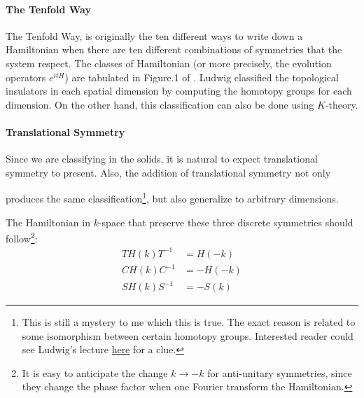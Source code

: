 \paragraph{The Tenfold Way}

The Tenfold Way, is originally the ten different ways to write down a
Hamiltonian when there are ten different combinations of symmetries that the 
system respect. The classes of Hamiltonian (or more precisely, the evolution
operators $e^{itH}$) are tabulated in Figure.1 of \cite{Ludwig2016}. Ludwig
classified the topological insulators in each spatial dimension by computing the
homotopy groups for each dimension. On the other hand, this classification can
also be done using $K$-theory.

\paragraph{Translational Symmetry}

Since we are classifying in the solids, it is natural to expect translational
symmetry to present. Also, the addition of translational symmetry not only
																		
					  

																				
produces the same classification\footnote{This is still a mystery to me which this is true. The
	exact reason is related to some isomorphism between certain homotopy groups.
	Interested reader could see Ludwig's lecture
	\href{http://boulderschool.yale.edu/2016/boulder-school-2016-lecture-notes}{here}
	for a clue.}, but also generalize to arbitrary dimensions.

The Hamiltonian in $k$-space that preserve these three discrete symmetries
should follow\footnote{It is easy to anticipate the change $k\to -k$ for
	anti-unitary symmetries, since they change the phase factor when one Fourier
	transform the Hamiltonian.}:
\begin{subequations}
	\begin{align}
	\label{eq:T-sym-Hk}
	TH(k)T^{-1} &= H(-k) \\
	\label{eq:C-sym-Hk}
	CH(k)C^{-1} &= -H(-k) \\
	\label{eq:S-sym-Hk}
	SH(k)S^{-1} &= -S(k)
	\end{align}
\end{subequations}

